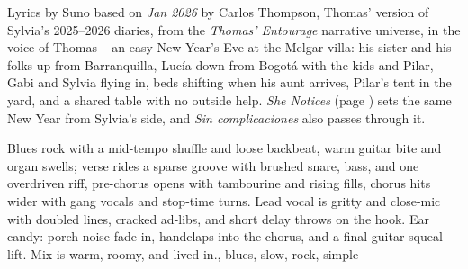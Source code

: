 
\label{sec:melgar-table}

\begin{notes}
Lyrics by Suno based on \emph{Jan 2026} by Carlos Thompson, Thomas' version of Sylvia's 2025--2026 diaries, from the \emph{Thomas' Entourage} narrative universe, in the voice of Thomas -- an easy New Year's Eve at the Melgar villa: his sister and his folks up from Barranquilla, Lucía down from Bogotá with the kids and Pilar, Gabi and Sylvia flying in, beds shifting when his aunt arrives, Pilar's tent in the yard, and a shared table with no outside help. \emph{She Notices} (page \pageref{sec:she-notices}) sets the same New Year from Sylvia's side, and \emph{Sin complicaciones} also passes through it.
\end{notes}

\begin{style}
Blues rock with a mid-tempo shuffle and loose backbeat, warm guitar bite and organ swells; verse rides a sparse groove with brushed snare, bass, and one overdriven riff, pre-chorus opens with tambourine and rising fills, chorus hits wider with gang vocals and stop-time turns. %
Lead vocal is gritty and close-mic with doubled lines, cracked ad-libs, and short delay throws on the hook. %
Ear candy: porch-noise fade-in, handclaps into the chorus, and a final guitar squeal lift. %
Mix is warm, roomy, and lived-in., blues, slow, rock, simple
\end{style}

